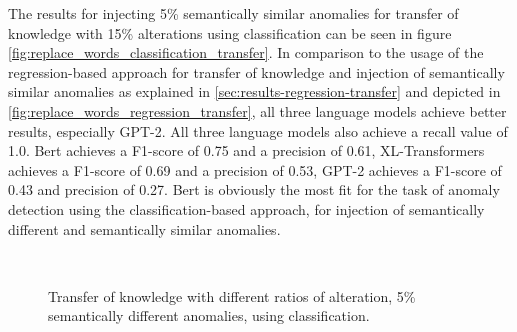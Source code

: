 

The results for injecting 5\% semantically similar anomalies for transfer of knowledge with 15\% alterations using classification can be seen in figure \ref{fig:replace_words_classification_transfer}. In comparison to the usage of the regression-based approach for transfer of knowledge and injection of semantically similar anomalies as explained in \ref{sec:results-regression-transfer} and depicted in \ref{fig:replace_words_regression_transfer}, all three language models achieve better results, especially GPT-2. All three language models also achieve a recall value of 1.0. Bert achieves a F1-score of 0.75 and a precision of 0.61, XL-Transformers achieves a F1-score of 0.69 and a precision of 0.53, GPT-2 achieves a F1-score of 0.43 and precision of 0.27. Bert is obviously the most fit for the task of anomaly detection using the classification-based approach, for injection of semantically different and semantically similar anomalies.

  
\begin{figure*}[ht!]
\centering
  \captionsetup{justification=centering}
\hspace{\fill}
\hspace{\fill}
   \\
\caption{\label{fig:results_transfer_classification}Transfer of knowledge with different ratios of alteration, 5\% semantically different anomalies, using classification.}
\end{figure*}

